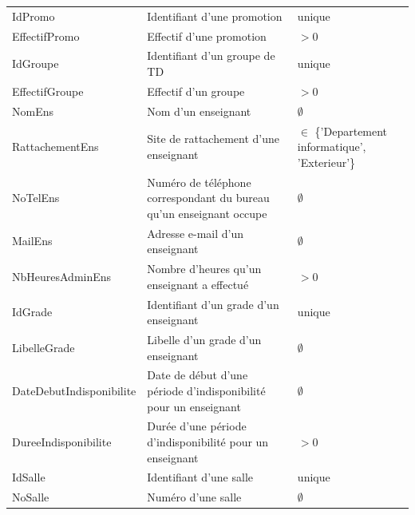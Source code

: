\documentclass{article}
\begin{document}
\begin{tabular}{|p{4cm}|p{8cm}|p{5cm}|}

  IdPromo & Identifiant d'une promotion & unique \\

  EffectifPromo & Effectif d'une promotion & $> 0$ \\

  IdGroupe & Identifiant d'un groupe de TD & unique \\

  EffectifGroupe & Effectif d'un groupe & $> 0$ \\

  NomEns & Nom d'un enseignant & $\emptyset$ \\

  RattachementEns & Site de rattachement d'une enseignant & $\in$ \{'Departement informatique', 'Exterieur'\} \\


  NoTelEns & Numéro de téléphone correspondant du bureau qu'un enseignant occupe & $\emptyset$ \\

  MailEns & Adresse e-mail d'un enseignant & $\emptyset$ \\

  NbHeuresAdminEns & Nombre d'heures qu'un enseignant a effectué & $> 0$ \\

  IdGrade & Identifiant d'un grade d'un enseignant & unique \\

  LibelleGrade & Libelle d'un grade d'un enseignant & $\emptyset$ \\

  DateDebutIndisponibilite & Date de début d'une période d'indisponibilité pour un enseignant & $\emptyset$ \\

  DureeIndisponibilite & Durée d'une période d'indisponibilité pour un enseignant & $> 0$ \\

  IdSalle & Identifiant d'une salle & unique \\

  NoSalle & Numéro d'une salle & $\emptyset$ \\


\end{tabular}
\end{document}
